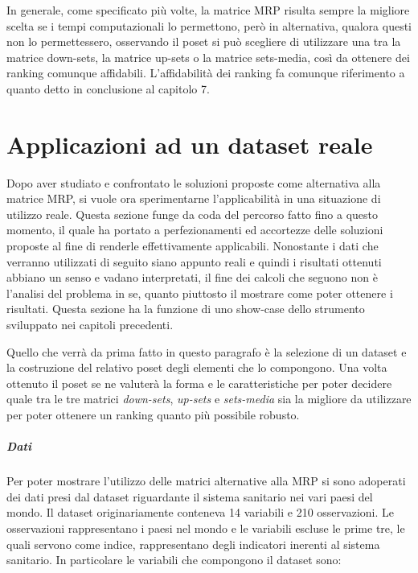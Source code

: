 \documentclass{report}
\begin{document}
In generale, come specificato più volte, la matrice MRP risulta sempre la migliore scelta se i tempi computazionali lo permettono, però in alternativa, qualora questi non lo permettessero, osservando il poset si può scegliere di utilizzare una tra la matrice down-sets, la matrice up-sets o la matrice sets-media, così da ottenere dei ranking comunque affidabili. L'affidabilità dei ranking fa comunque riferimento a quanto detto in conclusione al capitolo 7.

\chapter{Applicazioni ad un dataset reale}

Dopo aver studiato e confrontato le soluzioni proposte come alternativa alla matrice MRP, si vuole ora sperimentarne l'applicabilità in una situazione di utilizzo reale. Questa sezione funge da coda del percorso fatto fino a questo momento, il quale ha portato a perfezionamenti ed accortezze delle soluzioni proposte al fine di renderle effettivamente applicabili. Nonostante i dati che verranno utilizzati di seguito siano appunto reali e quindi i risultati ottenuti abbiano un senso e vadano interpretati, il fine dei calcoli che seguono non è l'analisi del problema in se, quanto piuttosto il mostrare come poter ottenere i risultati. Questa sezione ha la funzione di uno show-case dello strumento sviluppato nei capitoli precedenti.


Quello che verrà da prima fatto in questo paragrafo è la selezione di un dataset e la costruzione del relativo poset degli elementi che lo compongono. Una volta ottenuto il  poset se ne valuterà la forma e le caratteristiche per poter decidere quale tra le tre matrici \textit{down-sets}, \textit{up-sets} e \textit{sets-media} sia la migliore da utilizzare per poter ottenere un ranking quanto più possibile robusto.


\paragraph{Dati}
Per poter mostrare l'utilizzo delle matrici alternative alla MRP si sono adoperati dei dati presi dal dataset \citet{web:lang:stats} riguardante il sistema sanitario nei vari paesi del mondo.
Il dataset originariamente conteneva 14 variabili e 210 osservazioni. Le osservazioni rappresentano i paesi nel mondo e le variabili escluse le prime tre, le quali servono come indice, rappresentano degli indicatori inerenti al sistema sanitario. In particolare le variabili che compongono il dataset sono:
\end{document}
